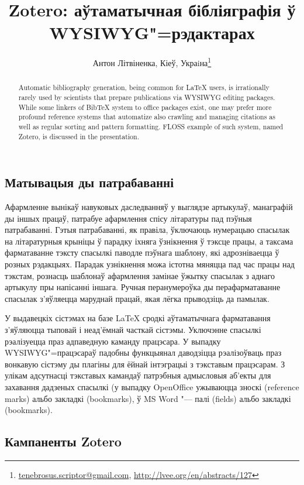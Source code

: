 \documentclass[10pt, a5paper]{article}
\begin{document}
\title{Zotero: аўтаматычная бібліяграфія ў WYSIWYG"=рэдактарах}
\author{Антон Літвіненка, Кіеў, Украiна\footnote{\url{tenebrosus.scriptor@gmail.com}, \url{http://lvee.org/en/abstracts/127}}}
\maketitle
\begin{abstract}
Automatic bibliography generation, being common for LaTeX users, is irrationally rarely used by scientists that prepare publica\-tions via WYSIWYG editing packages. While some linkers of BibTeX system to office packages exist, one may prefer more profound reference systems that automatize also crawling and managing citations as well as regular sorting and pattern format\-ting. FLOSS example of such system, named Zotero, is discussed in the presentation.
\end{abstract}
\subsection*{Матывацыя ды патрабаванні}

Афармленне вынікаў навуковых даследванняў у выглядзе артыкулаў, манаграфій ды іншых працаў, патрабуе афармлення спісу літаратуры пад пэўныя патрабаванні. Гэтыя патрабаванні, як правіла, ўключаюць нумерацыю спасылак на літаратурныя крыніцы ў парадку іхняга ўзнікнення ў тэксце працы, а таксама фарматаванне тэксту спасылкі паводле пэўнага шаблону, які адрозніваецца ў розных рэдакцыях. Парадак узнікнення можа істотна мяняцца пад час працы над тэкстам, рознасць шаблонаў афармлення замінае ўжытку спасылак з аднаго артыкулу пры напісанні іншага. Ручная перанумероўка ды перафарматаванне спасылак з’яўляецца маруднай працай, якая лёгка прыводзіць да памылак.

У выдавецкіх сістэмах на базе LaTeX сродкі аўтаматычнага фарматавання з’яўляюцца тыповай і неад’ёмнай часткай сістэмы. Уключэнне спасылкі рэалізуецца праз адпаведную каманду працэсара. У выпадку WYSIWYG"=працэсараў падобны функцыянал даводзіцца рэалізоўваць праз вонкавую сістэму ды плагіны для ёйнай інтэграцыі з тэкставым працэсарам. З улікам адсутнасці тэкставых камандаў патрэбныя адмысловыя аб’екты для захавання дадзеных спасылкі (у выпадку OpenOffice ужываюцца зноскі (reference marks) альбо закладкі (bookmarks), ў MS Word "--- палі (fields) альбо закладкі (bookmarks).

\subsection*{Кампаненты Zotero}
\end{document}
